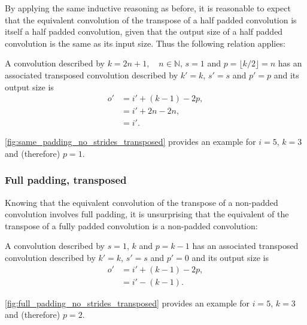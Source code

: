 By applying the same inductive reasoning as before, it is reasonable to expect
that the equivalent convolution of the transpose of a half padded convolution
is itself a half padded convolution, given that the output size of a half
padded convolution is the same as its input size. Thus the following relation
applies:

\begin{relationship}\label{rel:half_padding_no_strides_transposed}
A convolution described by $k = 2n + 1, \quad n \in \mathbb{N}$, $s = 1$ and $p
= \lfloor k / 2 \rfloor = n$ has an associated transposed convolution described
by $k' = k$, $s' = s$ and $p' = p$ and its output size is
\begin{equation*}
\begin{split}
    o' &= i' + (k - 1) - 2p ,\\
       &= i' + 2n - 2n ,\\
       &= i'.
\end{split}
\end{equation*}
\end{relationship}

\noindent\autoref{fig:same_padding_no_strides_transposed} provides an example
for $i = 5$, $k = 3$ and (therefore) $p = 1$.

\subsubsection{Full padding, transposed}

Knowing that the equivalent convolution of the transpose of a non-padded
convolution involves full padding, it is unsurprising that the equivalent of
the transpose of a fully padded convolution is a non-padded convolution:

\begin{relationship}\label{rel:full_padding_no_strides_transposed}
A convolution described by $s = 1$, $k$ and $p = k - 1$ has an
associated transposed convolution described by $k' = k$, $s' = s$ and $p' = 0$
and its output size is
\begin{equation*}
\begin{split}
    o' &= i' + (k - 1) - 2p ,\\
       &= i' - (k - 1).
\end{split}
\end{equation*}
\end{relationship}

\noindent\autoref{fig:full_padding_no_strides_transposed} provides an example
for $i = 5$, $k = 3$ and (therefore) $p = 2$.

